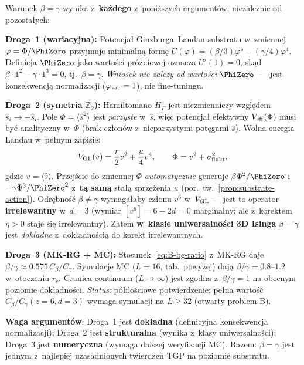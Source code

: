 \begin{theorem}[Trzy niezale\.zne drogi do $\beta = \gamma$]%
\label{thm:beta-eq-gamma-triple}
Warunek $\beta = \gamma$ wynika z~\textbf{ka\.zdego} z~poni\.zszych
argument\'ow, niezale\.znie od pozosta\l{}ych:

\medskip\noindent
\textbf{Droga~1 (wariacyjna):} Potencja\l{} Ginzburga--Landau substratu
w~zmiennej $\varphi = \Phi/\PhiZero$ przyjmuje minimaln\k{a} form\k{e}
$U(\varphi) = (\beta/3)\varphi^3 - (\gamma/4)\varphi^4$.
Definicja $\PhiZero$ jako warto\'sci pr\'o\.zniowej oznacza
$U'(1) = 0$, sk\k{a}d $\beta\cdot 1^2 - \gamma\cdot 1^3 = 0$,
tj.\ $\beta = \gamma$.
\emph{Wniosek nie zale\.zy od warto\'sci $\PhiZero$}~---
jest konsekwencj\k{a} normalizacji ($\varphi_{\rm vac} = 1$),
nie fine-tuningu.

\medskip\noindent
\textbf{Droga~2 (symetria $\mathbb{Z}_2$):}
Hamiltoniano $H_\Gamma$ jest niezmienniczy wzgl\k{e}dem
$\hat{s}_i \to -\hat{s}_i$. Pole $\Phi = \langle\hat{s}^2\rangle$
jest \emph{parzyste} w~$\hat{s}$, wi\k{e}c potencja\l{} efektywny
$V_{\rm eff}(\Phi)$ musi by\'c analityczny w~$\Phi$ (brak cz\l{}on\'ow
z~nieparzystymi pot\k{e}gami $\hat{s}$). Wolna energia Landau
w~pe\l{}nym zapisie:
\begin{equation}\label{eq:VGL-full}
  V_{\rm GL}(v) = \frac{r}{2}v^2 + \frac{u}{4}v^4,
  \qquad \Phi = v^2 + \sigma^2_{\rm flukt},
\end{equation}
gdzie $v = \langle\hat{s}\rangle$. Przej\'scie do zmiennej $\Phi$
\emph{automatycznie} generuje $\beta\Phi^2/\PhiZero$ i~$-\gamma\Phi^3/\PhiZero^2$
z~\textbf{t\k{a} sam\k{a}} sta\l{}\k{a} sprz\k{e}\.zenia $u$
(por.\ tw.~\ref{prop:substrate-action}). Odr\k{e}bno\'s\'c
$\beta \neq \gamma$ wymaga\l{}aby cz\l{}onu $v^6$ w~$V_{\rm GL}$
--- jest to operator \textbf{irrelewantny} w~$d = 3$
(wymiar $[v^6] = 6 - 2d = 0$ marginalny; ale z~korektem
$\eta > 0$ staje si\k{e} irrelewantny).
Zatem \textbf{w~klasie uniwersalno\'sci 3D Isinga}
$\beta = \gamma$ jest \emph{dok\l{}adne} z~dok\l{}adno\'sci\k{a}
do korekt irrelewantnych.

\medskip\noindent
\textbf{Droga~3 (MK-RG + MC):}
Stosunek~\eqref{eq:B-bg-ratio} z~MK-RG daje $\beta/\gamma \approx 0.575\,C_\beta/C_\gamma$.
Symulacje MC ($L = 16$, tab.~powy\.zej) daj\k{a} $\beta/\gamma = 0.8$--$1.2$
w~otoczeniu $r_c$. Granica continuum ($L \to \infty$) jest zgodna
z~$\beta/\gamma = 1$ na obecnym poziomie dok\l{}adno\'sci.
\emph{Status}: p\'o\l{}ilo\'sciowe potwierdzenie;
pe\l{}na warto\'s\'c $C_\beta/C_\gamma(z{=}6, d{=}3)$
wymaga symulacji na $L \geq 32$ (otwarty problem B).

\medskip\noindent
\textbf{Waga argument\'ow}:
Droga~1 jest \textbf{dok\l{}adna} (definicyjna konsekwencja normalizacji);
Droga~2 jest \textbf{strukturalna} (wynika z~klasy uniwersalno\'sci);
Droga~3 jest \textbf{numeryczna} (wymaga dalszej weryfikacji MC).
Razem: $\beta = \gamma$ jest jednym z~najlepiej uzasadnionych
twierdze\'n TGP na poziomie substratu.
\end{theorem}

